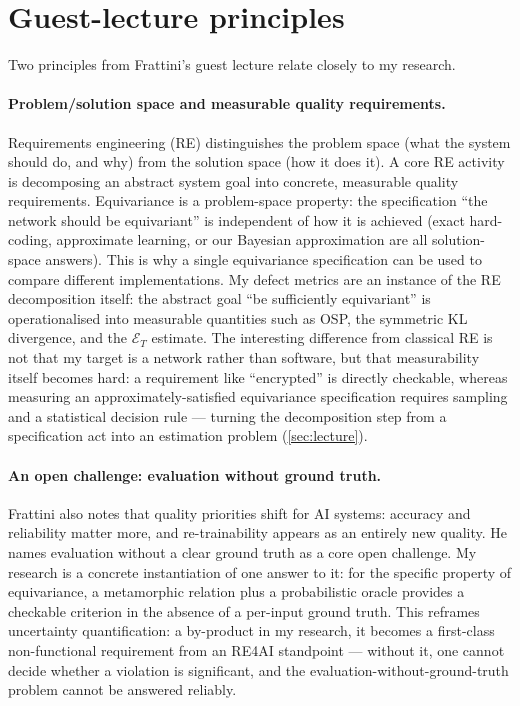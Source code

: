 \documentclass[11pt, a4paper]{article}
\begin{document}
\section{Guest-lecture principles}

Two principles from Frattini's guest lecture relate closely to my research.

\paragraph{Problem/solution space and measurable quality requirements.} Requirements engineering (RE) distinguishes the problem space (what the system should do, and why) from the solution space (how it does it). A core RE activity is decomposing an abstract system goal into concrete, measurable quality requirements. Equivariance is a problem-space property: the specification ``the network should be equivariant'' is independent of how it is achieved (exact hard-coding, approximate learning, or our Bayesian approximation are all solution-space answers). This is why a single equivariance specification can be used to compare different implementations. My defect metrics are an instance of the RE decomposition itself: the abstract goal ``be sufficiently equivariant'' is operationalised into measurable quantities such as OSP, the symmetric KL divergence, and the $\mathcal{E}_{T}$ estimate. The interesting difference from classical RE is not that my target is a network rather than software, but that measurability itself becomes hard: a requirement like ``encrypted'' is directly checkable, whereas measuring an approximately-satisfied equivariance specification requires sampling and a statistical decision rule — turning the decomposition step from a specification act into an estimation problem (\cref{sec:lecture}).

\paragraph{An open challenge: evaluation without ground truth.} Frattini also notes that quality priorities shift for AI systems: accuracy and reliability matter more, and re-trainability appears as an entirely new quality. He names evaluation without a clear ground truth as a core open challenge. My research is a concrete instantiation of one answer to it: for the specific property of equivariance, a metamorphic relation plus a probabilistic oracle provides a checkable criterion in the absence of a per-input ground truth. This reframes uncertainty quantification: a by-product in my research, it becomes a first-class non-functional requirement from an RE4AI standpoint — without it, one cannot decide whether a violation is significant, and the evaluation-without-ground-truth problem cannot be answered reliably.
\end{document}
